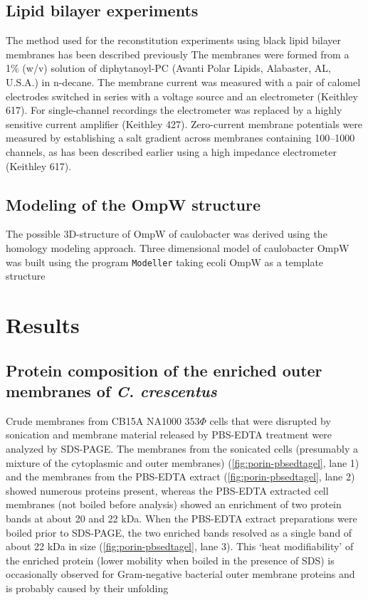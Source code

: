 \subsection{Lipid bilayer experiments}
\label{sub:porin_bilayer}
The method used for the reconstitution experiments using black lipid bilayer membranes has been described previously The membranes were formed from a 1\% (w/v) solution of diphytanoyl-\ac{PC} (Avanti Polar Lipids, Alabaster, AL, U.S.A.) in n-decane. The membrane current was measured with a pair of calomel electrodes switched in series with a voltage source and an electrometer (Keithley 617). For single-channel recordings the electrometer was replaced by a highly sensitive current amplifier (Keithley 427). Zero-current membrane potentials were measured by establishing a salt gradient across membranes containing 100--1000 channels, as has been described earlier using a high impedance electrometer (Keithley 617).

\subsection{Modeling of the OmpW structure}
\label{sub:porin_modeling}
The possible 3D-structure of OmpW of \ac{caulobacter} was derived using the homology modeling approach. Three dimensional model of \ac{caulobacter} OmpW was built using the program \texttt{Modeller} taking \ac{ecoli} OmpW as a template structure
 
\section{Results}

\subsection{Protein composition of the enriched outer membranes of \textit{C. crescentus}}
Crude membranes from \caulobacter CB15A NA1000 353$\Phi$ cells that were disrupted by sonication and membrane material released by \ac{PBS}-\ac{EDTA} treatment were analyzed by \ac{SDS-PAGE}. The membranes from the sonicated cells (presumably a mixture of the cytoplasmic and outer membranes) (\cref{fig:porin-pbsedtagel}, lane 1) and the membranes from the \ac{PBS}-\ac{EDTA} extract (\cref{fig:porin-pbsedtagel}, lane 2) showed numerous proteins present, whereas the \ac{PBS}-\ac{EDTA} extracted cell membranes (not boiled before analysis) showed an enrichment of two protein bands at about 20 and 22 kDa. When the \ac{PBS}-\ac{EDTA} extract preparations were boiled prior to \ac{SDS-PAGE}, the two enriched bands resolved as a single band of about 22 kDa in size (\cref{fig:porin-pbsedtagel}, lane 3). This `heat modifiability' of the enriched protein (\ie lower mobility when boiled in the presence of \textsc{SDS}) is occasionally observed for Gram-negative bacterial outer membrane proteins and is probably caused by their unfolding

